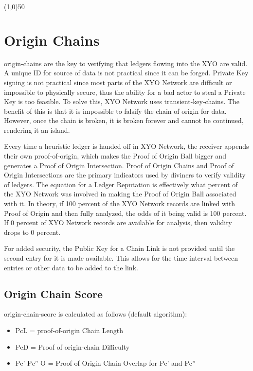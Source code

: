 \documentclass{article}
\begin{document}
\begin{center}
\line(1,0){50}
\end{center}

\section {Origin Chains}
\Glspl{origin-chain} are the key to verifying that ledgers flowing into the \Gls{XYO} are valid. A unique ID for source of data is not practical since it can be forged. Private Key signing is not practical since most parts of the XYO Network are difficult or impossible to physically secure, thus the ability for a bad actor to steal a Private Key is too feasible. To solve this, XYO Network uses \Glspl{transient-key-chain}. The benefit of this is that it is impossible to falsify the chain of origin for data. However, once the chain is broken, it is broken forever and cannot be continued, rendering it an island. 

Every time a \gls{heuristic} ledger is handed off in XYO Network, the receiver appends their own \Gls{proof-of-origin}, which makes the Proof of Origin Ball bigger and generates a Proof of Origin Intersection. Proof of Origin Chains and Proof of Origin Intersections are the primary indicators used by \Glspl{diviner} to verify validity of ledgers. The equation for a Ledger Reputation is effectively what percent of the XYO Network was involved in making the Proof of Origin Ball associated with it. In theory, if 100 percent of the XYO Network records are linked with Proof of Origin and then fully analyzed, the odds of it being valid is 100 percent. If 0 percent of XYO Network records are available for analysis, then validity drops to 0 percent.

For added security, the Public Key for a Chain Link is not provided until the second entry for it is made available. This allows for the time interval between entries or other data to be added to the link.

\subsection {Origin Chain Score}
\Gls{origin-chain-score} is calculated as follows (default algorithm):

\begin{itemize}
\item PcL = \Gls{proof-of-origin} Chain Length
\item PcD = Proof of \Gls{origin-chain} Difficulty
\item Pc' Pc'' O = Proof of Origin Chain Overlap for Pc' and Pc''
\end{itemize}
\end{document}
